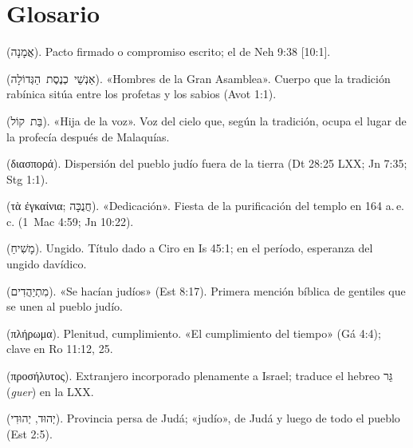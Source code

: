 \documentclass[11pt,letterpaper]{article}
\newcommand{\heb}[1]{\mbox{\foreignlanguage{hebrew}{#1}}}
\newcommand{\grc}[1]{\foreignlanguage{ancientgreek}{#1}}
\begin{document}
\section*{Glosario}
\begin{description}\small
\item[Amaná] (\heb{אֲמָנָה}). Pacto firmado o compromiso escrito; el de Neh 9:38 [10:1].
\item[Anshei Knéset ha-Guedolá] (\heb{אַנְשֵׁי כְנֶסֶת הַגְּדוֹלָה}). «Hombres de la Gran Asamblea». Cuerpo que la tradición rabínica sitúa entre los profetas y los sabios (Avot 1:1).
\item[Bat qol] (\heb{בַּת קוֹל}). «Hija de la voz». Voz del cielo que, según la tradición, ocupa el lugar de la profecía después de Malaquías.
\item[Diáspora] (\grc{διασπορά}). Dispersión del pueblo judío fuera de la tierra (Dt 28:25 LXX; Jn 7:35; Stg 1:1).
\item[Enkainia / Janucá] (\grc{τὰ ἐγκαίνια}; \heb{חֲנֻכָּה}). «Dedicación». Fiesta de la purificación del templo en 164 a.\,e.\,c. (1~Mac 4:59; Jn 10:22).
\item[Mashíaj] (\heb{מָשִׁיחַ}). Ungido. Título dado a Ciro en Is 45:1; en el período, esperanza del ungido davídico.
\item[Mityahadim] (\heb{מִתְיַהֲדִים}). «Se hacían judíos» (Est 8:17). Primera mención bíblica de gentiles que se unen al pueblo judío.
\item[Pleroma] (\grc{πλήρωμα}). Plenitud, cumplimiento. «El cumplimiento del tiempo» (Gá 4:4); clave en Ro 11:12, 25.
\item[Prosélito] (\grc{προσήλυτος}). Extranjero incorporado plenamente a Israel; traduce el hebreo \heb{גֵּר} (\emph{guer}) en la LXX.
\item[Yehud / Yehudí] (\heb{יְהוּד}, \heb{יְהוּדִי}). Provincia persa de Judá; «judío», de Judá y luego de todo el pueblo (Est 2:5).
\end{description}
\end{document}
